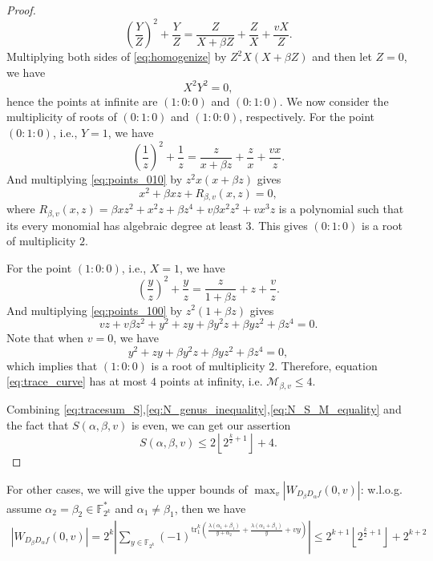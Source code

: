 \documentclass[8pt,oneside]{article}
\newcommand{\0}{\textbf{0}}
\newcommand{\1}{\textbf{1}}
\newcommand{\tr}{\mathrm{tr}_1^k}
\newcommand{\F}{\mathbb{F}}
\newtheorem{proof}{Proof}
\begin{document}
\begin{proof}
\begin{equation}
            \left( \frac{Y}{Z} \right)^2+\frac{Y}{Z}=\frac{Z}{X+\beta Z}+\frac{Z}{X}+\frac{vX}{Z}.
        \end{equation}
        Multiplying both sides of \eqref{eq:homogenize} by $ Z^2X\left( X+\beta Z \right) $ and then let $ Z=0 $, 
        we have 
        \[X^2Y^2=0,\]
        hence the points at infinite are $ (1:0:0) $ and $ (0:1:0) $. 
        We now consider the multiplicity of roots of $ (0 : 1 : 0) $ and $ (1 : 0 : 0) $, respectively. 
        For the point $ (0 : 1 : 0 ) $, i.e., $ Y = 1 $, we have
        \begin{equation}\label{eq:points_010}
            \left( \frac{1}{z} \right)^2+\frac{1}{z}=\frac{z}{x+\beta z}+\frac{z}{x}+\frac{vx}{z}.
        \end{equation}
        And multiplying \eqref{eq:points_010} by $ z^2x(x+\beta z) $ gives 
        \[x^2+\beta xz+R_{\beta,v}(x,z)=0,\]
        where $ R_{\beta,v}(x,z)=\beta xz^2+x^2z+\beta z^4+v\beta x^2z^2+vx^3z $ is a polynomial 
        such that its every monomial has algebraic degree at least $ 3 $. 
        This gives $ (0 : 1 : 0) $ is a root of multiplicity $ 2 $. 
        
        For the point $ (1 : 0 : 0) $, i.e., $ X = 1 $, we have
        \begin{equation}\label{eq:points_100}
            \left( \frac{y}{z} \right)^2+\frac{y}{z}=\frac{z}{1+\beta z}+z+\frac{v}{z}.
        \end{equation}
        And multiplying \eqref{eq:points_100} by $ z^2(1+\beta z) $ gives 
        \[vz+v\beta z^2+y^2+zy+\beta y^2z+\beta yz^2+\beta z^4=0.\]
        Note that when $ v=0 $, we have 
        \[y^2+zy+\beta y^2z+\beta yz^2+\beta z^4=0,\]
        which implies that $ (1:0:0) $ is a root of multiplicity $ 2 $. 
        Therefore, equation \eqref{eq:trace_curve} has at most $ 4 $ points at infinity, i.e. 
        $ \mathcal{M}_{\beta,v}\le4 $. 

        Combining \eqref{eq:tracesum_S},\eqref{eq:N_genus_inequality},\eqref{eq:N_S_M_equality} and the fact that 
        $ S(\alpha,\beta,v) $ is even, we can get our assertion
        \[S(\alpha,\beta,v)\le 2\left\lfloor 2^{\frac{k}{2}+1}\right\rfloor+4.\]
    \end{proof}
    
    For other cases, we will give the upper bounds of $ \max_{v}|W_{D_{\beta}D_{\alpha}f}(0,v)| $: 
    w.l.o.g. assume $ \alpha_2=\beta_2\in\F_{2^k}^* $ and $ \alpha_1\ne\beta_1 $, then we have 
    \begin{align*}
        \left\lvert W_{D_{\beta}D_{\alpha}f}(0,v)\right\rvert =2^k\left\lvert \sum_{y\in\F_{2^k}}(-1)^{\tr\left(\frac{\lambda(\alpha_1+\beta_1)}{y+\alpha_2}+\frac{\lambda(\alpha_1+\beta_1)}{y}+vy\right)}\right\rvert\le 2^{k+1}\left\lfloor 2^{\frac{k}{2}+1}\right\rfloor+2^{k+2}
    \end{align*}



    


\end{document}
